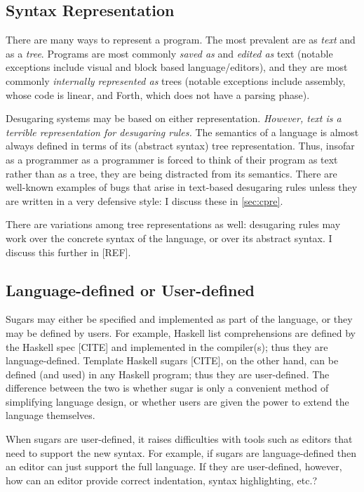 \subsection{Syntax Representation}

There are many ways to represent a program. The most prevalent are as
\emph{text} and as a \emph{tree}. Programs are most commonly
\emph{saved as} and \emph{edited as} text (notable exceptions include
visual and block based language/editors), and they are most commonly
\emph{internally represented as} trees (notable exceptions include
assembly, whose code is linear, and Forth, which does not have a
parsing phase).

Desugaring systems may be based on either representation.
\emph{However, text is a terrible representation for desugaring rules.}
The semantics of a language is almost always defined in terms of its
(abstract syntax) tree representation. Thus, insofar as a programmer
as a programmer is forced to think of their program as text rather
than as a tree, they are being distracted from its semantics. There
are well-known examples of bugs that arise in text-based desugaring
rules unless they are written in a very defensive style: I discuss
these in \ref{sec:cpre}.

There are variations among tree representations as well: desugaring
rules may work over the concrete syntax of the language, or over its
abstract syntax. I discuss this further in [REF].

\subsection{Language-defined or User-defined}

Sugars may either be specified and implemented as part of the
language, or they may be defined by users. For example, Haskell list
comprehensions are defined by the Haskell spec [CITE] and implemented
in the compiler(s); thus they are language-defined. Template Haskell
sugars [CITE], on the other hand, can be defined (and used) in any
Haskell program; thus they are user-defined. The difference between the two
is whether sugar is only a convenient method of simplifying language
design, or whether users are given the power to extend the language
themselves.

When sugars are user-defined, it raises difficulties with tools such
as editors that need to support the new syntax. For example, if sugars
are language-defined then an editor can just support the full
language. If they are user-defined, however, how can an editor provide
correct indentation, syntax highlighting, etc.?

